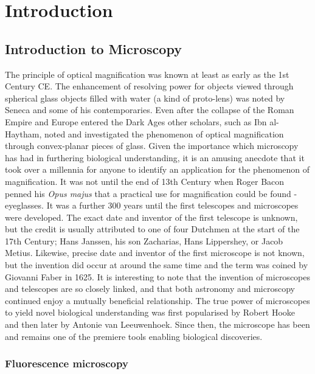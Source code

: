 \chapter{Introduction}

\section{Introduction to Microscopy}
\label{sec:microscopy}

The principle of optical magnification was known at least as early as the 1st 
Century CE. The enhancement of resolving power for objects viewed through 
spherical glass objects filled with water (a kind of proto-lens) was noted by 
Seneca and some of his contemporaries\cite{seneca1971naturales}. Even after 
the collapse of the Roman Empire and Europe entered the Dark Ages other 
scholars, such as Ibn al-Haytham, noted and investigated the phenomenon of 
optical magnification through convex-planar pieces of 
glass\cite{nasr1968science}. Given the importance which microscopy has had in 
furthering biological understanding, it is an amusing anecdote that it took 
over a millennia for anyone to identify an application for the phenomenon of 
magnification. It was not until the end of 13th Century  when Roger Bacon 
penned his \textit{Opus majus} that a practical use for magnification could 
be found - eyeglasses. It was a further 300 years until the first telescopes 
and microscopes were developed. The exact date and inventor of the first 
telescope is unknown, but the credit is usually attributed to one of four 
Dutchmen at the start of the 17th Century; Hans Janssen, his son Zacharias, 
Hans Lippershey, or Jacob Metius. Likewise, precise date and inventor of the 
first microscope is not known, but the invention did occur at around the same 
time and the term was coined by Giovanni Faber in 
1625\cite{bardell2004invention}. It is interesting to note that the invention 
of microscopes and telescopes are so closely linked, and that both astronomy 
and microscopy continued enjoy a mutually beneficial relationship. The true 
power of microscopes to yield novel biological understanding was first 
popularised by Robert Hooke and then later by Antonie van 
Leeuwenhoek\cite{hooke1665micrographia, chung2017pioneers}. Since then, the 
microscope has been and remains one of the premiere tools enabling biological 
discoveries.

\subsection{Fluorescence microscopy}
\label{subsec:fluorescence}

